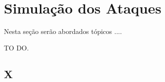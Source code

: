 \chapter{Simulação dos Ataques}
\label{chap:Simulacao}
	
	Nesta seção serão abordados tópicos ....

	TO DO.

	\section{X}
	\label{sec:Simulacao_X}

